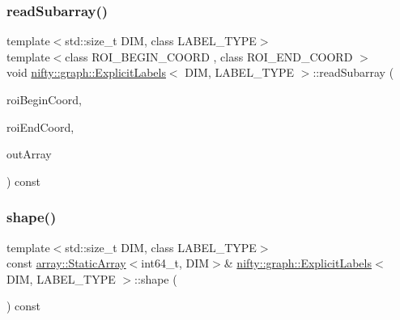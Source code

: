 \mbox{\label{classnifty_1_1graph_1_1ExplicitLabels_a8b3717b94ebe54a2d74f973792984e27}} 
\subsubsection{\texorpdfstring{read\+Subarray()}{readSubarray()}}
{\footnotesize\ttfamily template$<$std\+::size\+\_\+t D\+IM, class L\+A\+B\+E\+L\+\_\+\+T\+Y\+PE$>$ \\
template$<$class R\+O\+I\+\_\+\+B\+E\+G\+I\+N\+\_\+\+C\+O\+O\+RD , class R\+O\+I\+\_\+\+E\+N\+D\+\_\+\+C\+O\+O\+RD $>$ \\
void \hyperlink{classnifty_1_1graph_1_1ExplicitLabels}{nifty\+::graph\+::\+Explicit\+Labels}$<$ D\+IM, L\+A\+B\+E\+L\+\_\+\+T\+Y\+PE $>$\+::read\+Subarray (\begin{DoxyParamCaption}\item[{const R\+O\+I\+\_\+\+B\+E\+G\+I\+N\+\_\+\+C\+O\+O\+RD \&}]{roi\+Begin\+Coord,  }\item[{const R\+O\+I\+\_\+\+E\+N\+D\+\_\+\+C\+O\+O\+RD \&}]{roi\+End\+Coord,  }\item[{\hyperlink{classandres_1_1View}{marray\+::\+View}$<$ L\+A\+B\+E\+L\+\_\+\+T\+Y\+PE $>$ \&}]{out\+Array }\end{DoxyParamCaption}) const\hspace{0.3cm}{\ttfamily [inline]}}

\mbox{\label{classnifty_1_1graph_1_1ExplicitLabels_a84a51a06ef2d9609a6737662e51b8984}} 
\subsubsection{\texorpdfstring{shape()}{shape()}}
{\footnotesize\ttfamily template$<$std\+::size\+\_\+t D\+IM, class L\+A\+B\+E\+L\+\_\+\+T\+Y\+PE$>$ \\
const \hyperlink{namespacenifty_1_1array_a683f151f19c851754e0c6d55ed16a0c2}{array\+::\+Static\+Array}$<$int64\+\_\+t, D\+IM$>$\& \hyperlink{classnifty_1_1graph_1_1ExplicitLabels}{nifty\+::graph\+::\+Explicit\+Labels}$<$ D\+IM, L\+A\+B\+E\+L\+\_\+\+T\+Y\+PE $>$\+::shape (\begin{DoxyParamCaption}{ }\end{DoxyParamCaption}) const\hspace{0.3cm}{\ttfamily [inline]}}



